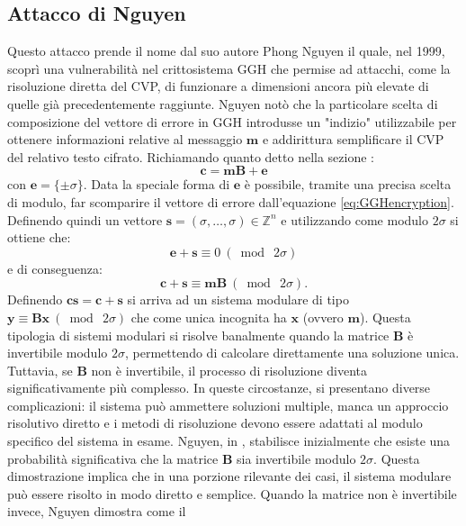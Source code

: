 \subsection{Attacco di Nguyen}
\label{sec:Nguyen}
Questo attacco prende il nome dal suo autore Phong Nguyen\cite{Nguyen99} il quale, nel 1999, scoprì una 
vulnerabilità nel crittosistema GGH che permise ad attacchi, come la risoluzione diretta del 
CVP, di funzionare a dimensioni ancora più elevate di quelle già precedentemente raggiunte. 
Nguyen notò che la particolare scelta di composizione del vettore di errore in GGH introdusse
un "indizio" utilizzabile per ottenere informazioni relative al messaggio $\mathbf{m}$
e addirittura semplificare il CVP del relativo testo cifrato. Richiamando quanto detto
nella sezione :
\begin{equation}
    \label{eq:GGHencryption}
    \mathbf{c} = \mathbf{m}\mathbf{B} + \mathbf{e}
\end{equation}
con $\mathbf{e} = \{\pm \sigma\}$. Data la speciale forma di $\mathbf{e}$ è possibile, tramite una precisa scelta di modulo,
far scomparire il vettore di errore dall'equazione \ref{eq:GGHencryption}. Definendo
quindi un vettore $\mathbf{s} = (\sigma,\dots,\sigma) \in \mathbb{Z}^n$ e utilizzando come
modulo $2\sigma$ si ottiene che:
\[
    \mathbf{e} + \mathbf{s} \equiv 0 \ (\bmod \ 2\sigma)
\]
e di conseguenza:
\[
    \mathbf{c} + \mathbf{s} \equiv \mathbf{m}\mathbf{B} \ (\bmod \ 2\sigma).
\]
Definendo $\mathbf{cs} = \mathbf{c} + \mathbf{s}$ si arriva ad un sistema modulare di tipo
$\mathbf{y} \equiv \mathbf{B}\mathbf{x}\ (\bmod \ 2\sigma)$ che come unica incognita 
ha $\mathbf{x}$ (ovvero $\mathbf{m}$). Questa tipologia di sistemi modulari si risolve banalmente quando la matrice 
$\mathbf{B}$ è invertibile modulo $2\sigma$, permettendo di calcolare direttamente una 
soluzione unica. 
Tuttavia, se $\mathbf{B}$ non è invertibile,  il processo di risoluzione diventa significativamente 
più complesso. In queste circostanze, si presentano diverse complicazioni: il sistema può 
ammettere soluzioni multiple, manca un approccio risolutivo diretto e i metodi 
di risoluzione devono essere adattati al modulo specifico del sistema in esame. Nguyen, 
in \cite{Nguyen99}, stabilisce inizialmente che esiste una probabilità significativa
che la matrice $\mathbf{B}$ sia invertibile modulo $2\sigma$. Questa dimostrazione implica 
che in una porzione rilevante dei casi, il sistema modulare può essere risolto in modo 
diretto e semplice. Quando la matrice non è invertibile invece, Nguyen dimostra come il
